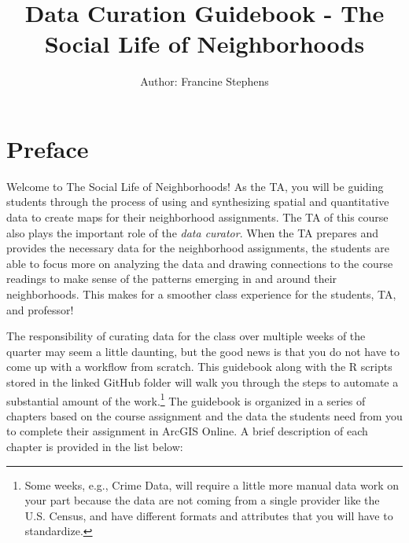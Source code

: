 \documentclass[
]{book}
\title{Data Curation Guidebook - The Social Life of Neighborhoods}
\author{Author: Francine Stephens}
\date{}
\begin{document}
\maketitle

{
\setcounter{tocdepth}{1}
\tableofcontents
}
\hypertarget{preface}{%
\chapter*{Preface}\label{preface}}

Welcome to The Social Life of Neighborhoods! As the TA, you will be guiding students through the process of using and synthesizing spatial and quantitative data to create maps for their neighborhood assignments. The TA of this course also plays the important role of the \emph{data curator}. When the TA prepares and provides the necessary data for the neighborhood assignments, the students are able to focus more on analyzing the data and drawing connections to the course readings to make sense of the patterns emerging in and around their neighborhoods. This makes for a smoother class experience for the students, TA, and professor!

The responsibility of curating data for the class over multiple weeks of the quarter may seem a little daunting, but the good news is that you do not have to come up with a workflow from scratch. This guidebook along with the R scripts stored in the linked GitHub folder will walk you through the steps to automate a substantial amount of the work.\footnote{Some weeks, e.g., Crime Data, will require a little more manual data work on your part because the data are not coming from a single provider like the U.S. Census, and have different formats and attributes that you will have to standardize.} The guidebook is organized in a series of chapters based on the course assignment and the data the students need from you to complete their assignment in ArcGIS Online. A brief description of each chapter is provided in the list below:
\end{document}
